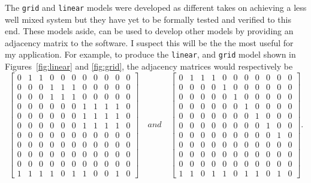 \documentclass[smallextended,referee]{svjour3}
\begin{document}
The \texttt{grid} and \texttt{linear} models were developed as different takes on achieving a less well mixed system but they have yet to be formally tested and verified to this end. These models aside, \pyplume{} can be used to develop other models by providing an adjacency matrix to the software. I suspect this will be the the most useful for my application. For example, to produce the \texttt{linear}, and \texttt{grid} model shown in Figures~\ref{fig:linear} and \ref{fig:grid}, the adjacency matrices would respectively be 
\setcounter{MaxMatrixCols}{12}
\renewcommand*{\arraystretch}{0.5}
\begin{equation*}
    \begin{bmatrix}
     0 & 1 & 1 & 0 & 0 & 0 & 0 & 0 & 0 & 0 & 0 \\
     0 & 0 & 0 & 1 & 1 & 1 & 0 & 0 & 0 & 0 & 0 \\
     0 & 0 & 0 & 1 & 1 & 1 & 0 & 0 & 0 & 0 & 0 \\
     0 & 0 & 0 & 0 & 0 & 0 & 1 & 1 & 1 & 1 & 0 \\
     0 & 0 & 0 & 0 & 0 & 0 & 1 & 1 & 1 & 1 & 0 \\
     0 & 0 & 0 & 0 & 0 & 0 & 1 & 1 & 1 & 1 & 0 \\
     0 & 0 & 0 & 0 & 0 & 0 & 0 & 0 & 0 & 0 & 0 \\ 
     0 & 0 & 0 & 0 & 0 & 0 & 0 & 0 & 0 & 0 & 0 \\ 
     0 & 0 & 0 & 0 & 0 & 0 & 0 & 0 & 0 & 0 & 0 \\ 
     0 & 0 & 0 & 0 & 0 & 0 & 0 & 0 & 0 & 0 & 0 \\ 
     1 & 1 & 1 & 1 & 0 & 1 & 1 & 0 & 0 & 1 & 0 
    \end{bmatrix}\quad and\quad
    \begin{bmatrix}
     0 & 1 & 1 & 1 & 0 & 0 & 0 & 0 & 0 & 0 & 0 \\
     0 & 0 & 0 & 0 & 1 & 0 & 0 & 0 & 0 & 0 & 0 \\
     0 & 0 & 0 & 0 & 0 & 1 & 0 & 0 & 0 & 0 & 0 \\
     0 & 0 & 0 & 0 & 0 & 0 & 1 & 0 & 0 & 0 & 0 \\
     0 & 0 & 0 & 0 & 0 & 0 & 0 & 1 & 0 & 0 & 0 \\
     0 & 0 & 0 & 0 & 0 & 0 & 0 & 0 & 1 & 0 & 0 \\
     0 & 0 & 0 & 0 & 0 & 0 & 0 & 0 & 0 & 1 & 0 \\
     0 & 0 & 0 & 0 & 0 & 0 & 0 & 0 & 0 & 0 & 0 \\
     0 & 0 & 0 & 0 & 0 & 0 & 0 & 0 & 0 & 0 & 0 \\
     0 & 0 & 0 & 0 & 0 & 0 & 0 & 0 & 0 & 0 & 0 \\
     1 & 1 & 0 & 1 & 1 & 0 & 1 & 1 & 0 & 1 & 0 
 \end{bmatrix}.
\end{equation*}
\end{document}
